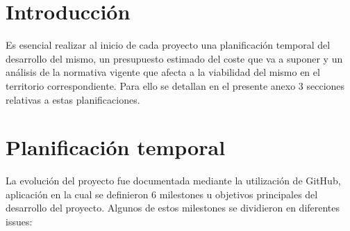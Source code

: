 
\section{Introducción}
Es esencial realizar al inicio de cada proyecto una planificación temporal del desarrollo del mismo, un presupuesto estimado del coste que va a suponer y un análisis de la normativa vigente que afecta a la viabilidad del mismo en el territorio correspondiente. Para ello se detallan en el presente anexo 3 secciones relativas a estas planificaciones.

\section{Planificación temporal}
La evolución del proyecto fue documentada mediante la utilización de GitHub, aplicación en la cual se definieron 6 milestones u objetivos principales del desarrollo del proyecto. Algunos de estos milestones se dividieron en diferentes issues:
